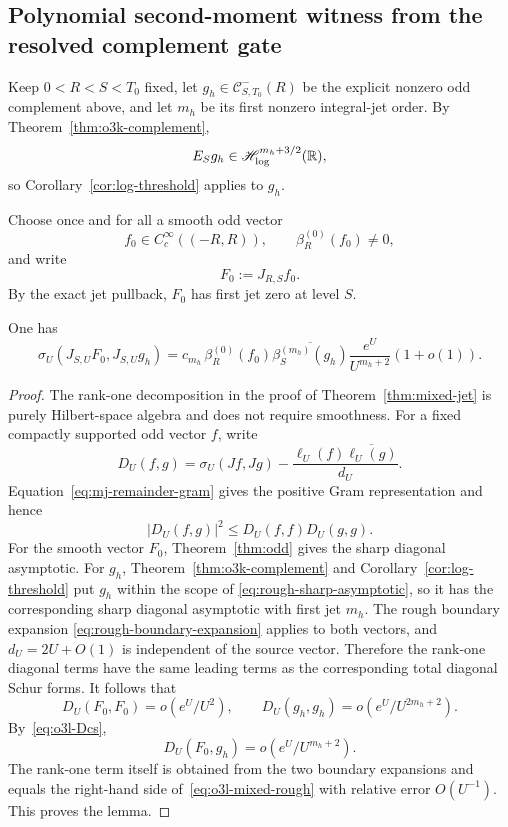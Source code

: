 
\subsection{Polynomial second-moment witness from the resolved complement gate}\label{subsec:o3l-polynomial-witness}

Keep $0<R<S<T_0$ fixed, let $g_h\in\mathcal C^-_{S,T_0}(R)$ be the explicit nonzero
odd complement above, and let $m_h$ be its first nonzero integral-jet order.  By
Theorem~\ref{thm:o3k-complement},
\[
 E_Sg_h\in\mathscr H_{\log}^{m_h+3/2}(\mathbb R),
\]
so Corollary~\ref{cor:log-threshold} applies to $g_h$.

Choose once and for all a smooth odd vector
\[
 f_0\in C_c^\infty((-R,R)),
 \qquad \beta_R^{(0)}(f_0)\ne0,
\]
and write
\[
 F_0:=J_{R,S}f_0.
\]
By the exact jet pullback, $F_0$ has first jet zero at level $S$.

\begin{lemma}\label{lem:o3l-mixed-rough}
One has
\[
 \boxed{
 \sigma_U(J_{S,U}F_0,J_{S,U}g_h)
 =c_{m_h}\,\beta_R^{(0)}(f_0)
 \overline{\beta_S^{(m_h)}(g_h)}
 \frac{e^U}{U^{m_h+2}}(1+o(1)).
 }
\tag{O3L.1}\label{eq:o3l-mixed-rough}
\]
\end{lemma}

\begin{proof}
The rank-one decomposition in the proof of Theorem~\ref{thm:mixed-jet} is purely
Hilbert-space algebra and does not require smoothness.  For a fixed compactly supported
odd vector $f$, write
\[
 D_U(f,g)=\sigma_U(Jf,Jg)-
 \frac{\ell_U(f)\overline{\ell_U(g)}}{d_U}.
\]
Equation~\eqref{eq:mj-remainder-gram} gives the positive Gram representation and hence
\[
 |D_U(f,g)|^2\le D_U(f,f)D_U(g,g).
\tag{O3L.2}\label{eq:o3l-Dcs}
\]
For the smooth vector $F_0$, Theorem~\ref{thm:odd} gives the sharp diagonal asymptotic.
For $g_h$, Theorem~\ref{thm:o3k-complement} and
Corollary~\ref{cor:log-threshold} put $g_h$ within the scope of
\eqref{eq:rough-sharp-asymptotic}, so it has the corresponding sharp diagonal
asymptotic with first jet $m_h$.  The rough boundary expansion
\eqref{eq:rough-boundary-expansion} applies to both vectors, and
$d_U=2U+O(1)$ is independent of the source vector.  Therefore the rank-one diagonal
terms have the same leading terms as the corresponding total diagonal Schur forms.
It follows that
\[
 D_U(F_0,F_0)=o(e^U/U^2),
 \qquad
 D_U(g_h,g_h)=o(e^U/U^{2m_h+2}).
\]
By~\eqref{eq:o3l-Dcs},
\[
 D_U(F_0,g_h)=o(e^U/U^{m_h+2}).
\]
The rank-one term itself is obtained from the two boundary expansions and equals the
right-hand side of~\eqref{eq:o3l-mixed-rough} with relative error $O(U^{-1})$.  This
proves the lemma.
\end{proof}

